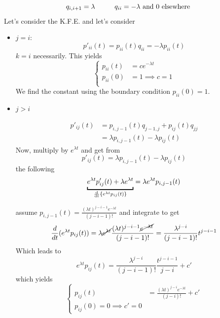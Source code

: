 \documentclass{article}
\begin{document}
	\begin{example}
		\begin{equation*}
			q_{i,i+1} = \lambda \hspace{1 cm} q_{ii} = -\lambda \text{ and } 0 \text{ elsewhere}
		\end{equation*}
		Let's consider the K.F.E. and let's consider 
		\begin{itemize}
			\item $j=i$:
			\begin{equation*}
				p'_{ii}(t) = p_{ii}(t) q_{ii} = -\lambda p_{ii}(t)
			\end{equation*}
			$k = i$ necessarily. This yields
			\[
			\begin{cases}
				p_{ii}(t) & = c e ^{-\lambda t} \\
				p_{ii}(0) & = 1 \implies c = 1 \\ 
			\end{cases}
			\]
			We find the constant using the boundary condition $p_{ii}(0) = 1 $.
			\item $j > i$
			\begin{figure}[H]
				\centering
				
			\end{figure}
				\begin{align*}
				p'_{ij}(t) &= p_{i,j-1}(t) q_{j-1,j} + p_{ij}(t) q_{jj}\\
				&= \lambda p_{i,j-1}(t) - \lambda p_{ij}(t)
			\end{align*}
			Now, multiply by $e^{\lambda t}$ and get from
			\begin{equation*}
				p'_{ij}(t) = \lambda p_{i,j-1}(t) - \lambda p_{ij}(t) 
			\end{equation*}
			the following
			\begin{equation*}
				\underbracket{e^{\lambda t} p'_{ij}(t) + \lambda e^{\lambda t}}_{\frac{\dif}{\dif t}\left\{e^{\lambda t}p_{ij}(t)\right\}}=\lambda e^{\lambda t}p_{i,j-1}(t)
			\end{equation*}
			
			assume $p_{i,j-1}(t) = \frac{(\lambda t)^{j-i-1}e^{-\lambda t}}{(j-i-1)!}$
			and integrate to get
			\begin{equation*}
				\frac{d}{dt}(e^{\lambda t} p_{ij}(t)) = \lambda \cancel{e^{\lambda t}} \frac{(\lambda t)^{j-i-1}\cancel{e^{-\lambda t}}}{(j-i-1)!} = \frac{\lambda^{j-i}}{(j-i-1)!} t ^{j-i-1}
			\end{equation*}
			Which leads to 
			\begin{equation*}
				e^{\lambda t}p _{ij}(t) =  \frac{\lambda^{j-i}}{(j-i-1)!} \frac{t ^{j-i-1} }{j-i} + c'
			\end{equation*}      
			which yields
			\[
			\begin{cases}
				p_{ij}(t) &= \frac{(\lambda t)^{j-i}e^{-\lambda t}}{(j-i)! } + c' \\
				p_{ij}(0) = 0 \implies c' = 0
			\end{cases}
			\]
			\end{itemize}
	\end{example}
\end{document}
